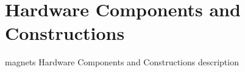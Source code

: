 \section{Hardware Components and Constructions}

magnets Hardware Components and Constructions description

